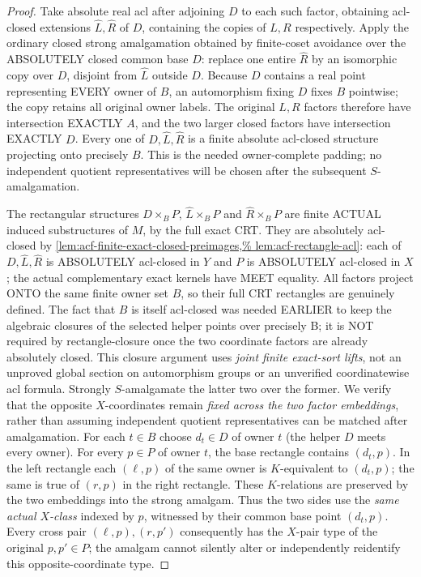 \begin{proof}
Take absolute real acl after
adjoining \(D\) to each such
factor, obtaining acl-closed
extensions \(\widehat L,\widehat R\)
of \(D\), containing the copies
of \(L,R\) respectively. Apply
the ordinary closed strong
amalgamation obtained by
finite-coset avoidance over
the ABSOLUTELY closed common
base \(D\): replace one entire
\(\widehat R\) by an isomorphic
copy over \(D\), disjoint from
\(\widehat L\) outside \(D\).
Because \(D\) contains a real
point representing EVERY owner
of \(B\), an automorphism
fixing \(D\) fixes \(B\)
pointwise; the copy retains
all original owner labels.
The original \(L,R\) factors
therefore have intersection
EXACTLY \(A\), and the two
larger closed factors have
intersection EXACTLY \(D\).
Every one of \(D,\widehat L,
\widehat R\) is a finite
absolute acl-closed structure
projecting onto precisely \(B\).
This is the needed owner-complete
padding; no independent quotient
representatives will be chosen
after the subsequent \(S\)-amalgamation.

The rectangular structures
\(D\times_B P\), \(\widehat L\times_B P\)
and \(\widehat R\times_B P\)
are finite ACTUAL induced substructures
of \(M\), by the full exact CRT.
They are absolutely acl-closed by
\cref{lem:acf-finite-exact-closed-preimages,%
lem:acf-rectangle-acl}:
each of \(D,\widehat L,\widehat R\)
is ABSOLUTELY acl-closed in \(Y\)
and \(P\) is ABSOLUTELY acl-closed
in \(X\); the actual complementary
exact kernels have MEET equality.
All factors project ONTO the same
finite owner set \(B\), so their
full CRT rectangles are genuinely
defined. The fact that \(B\) is
itself acl-closed was needed
EARLIER to keep the algebraic
closures of the selected helper
points over precisely B; it is
NOT required by rectangle-closure
once the two coordinate factors
are already absolutely closed.
This closure argument uses
\emph{joint finite exact-sort lifts},
not an unproved global section
on automorphism groups or an
unverified coordinatewise acl formula.
Strongly $S$-amalgamate the latter two over the former.
We verify that the opposite $X$-coordinates remain
\emph{fixed across the two factor embeddings}, rather than
assuming independent quotient representatives can be matched
after amalgamation.  For each $t\in B$ choose
$d_t\in D$ of owner $t$ (the helper $D$ meets every owner).
For every $p\in P$ of owner $t$, the base rectangle contains
$(d_t,p)$.  In the left rectangle each $(\ell,p)$ of the
same owner is $K$-equivalent to $(d_t,p)$; the same is true
of $(r,p)$ in the right rectangle.  These $K$-relations
are preserved by the two embeddings into the strong
amalgam.  Thus the two sides use the \emph{same actual
$X$-class} indexed by $p$, witnessed by their common
base point $(d_t,p)$.  Every cross pair
$(\ell,p),(r,p')$ consequently has the $X$-pair type
of the original $p,p'\in P$; the amalgam cannot
silently alter or independently reidentify this
opposite-coordinate type.


\end{proof}
